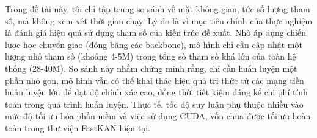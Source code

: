 \indent Trong đề tài này, tôi chỉ tập trung so sánh về mặt không gian, tức số lượng tham số, mà không xem xét thời gian chạy. Lý do là vì mục tiêu chính của thực nghiệm là đánh giá hiệu quả sử dụng tham số của kiến trúc đề xuất. Nhờ áp dụng chiến lược học chuyển giao (đóng băng các backbone), mô hình chỉ cần cập nhật một lượng nhỏ tham số (khoảng 4-5M) trong tổng số tham số khá lớn của toàn hệ thống (28-40M). So sánh này nhằm chứng minh rằng, chỉ cần huấn luyện một phần nhỏ gọn, mô hình vẫn có thể khai thác hiệu quả tri thức từ các mạng tiền huấn luyện lớn để đạt độ chính xác cao, đồng thời tiết kiệm đáng kể chi phí tính toán trong quá trình huấn luyện. Thực tế, tốc độ suy luận phụ thuộc nhiều vào mức độ tối ưu hóa phần mềm và việc sử dụng CUDA, vốn chưa được tối ưu hoàn toàn trong thư viện FastKAN hiện tại.